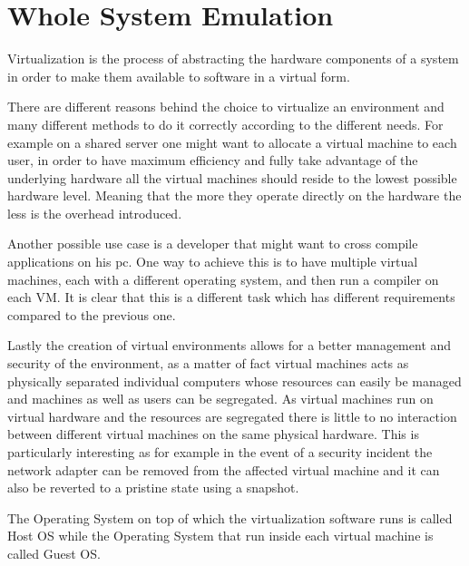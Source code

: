 \chapter{Whole System Emulation}
\label{chap:2}

Virtualization is the process of abstracting the hardware components of a system in order to make them available to software in a virtual form.

There are different reasons behind the choice to virtualize an environment and many different methods to do it correctly according to the different needs. For example on a shared server one might want to allocate a virtual machine to each user, in order to have maximum efficiency and fully take advantage of the underlying hardware all the virtual machines should reside to the lowest possible hardware level. Meaning that the more they operate directly on the hardware the less is the overhead introduced.

Another possible use case is a developer that might want to cross compile applications on his pc. One way to achieve this is to have multiple virtual machines, each with a different operating system, and then run a compiler on each VM. It is clear that this is a different task which has different requirements compared to the previous one.

Lastly the creation of virtual environments allows for a better management and security of the environment, as a matter of fact virtual machines acts as physically separated individual computers whose resources can easily be managed and machines as well as users can be segregated. As virtual machines run on virtual hardware and the resources are segregated there is little to no interaction between different virtual machines on the same physical hardware. This is particularly interesting as for example in the event of a security incident the network adapter can be removed from the affected virtual machine and it can also be reverted to a pristine state using a snapshot. 

The Operating System on top of which the virtualization software runs is called Host OS while the Operating System that run inside each virtual machine is called Guest OS. 


